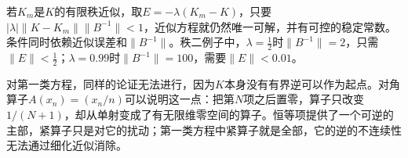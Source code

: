 若$K_m$是$K$的有限秩近似，取$E=-\lambda(K_m-K)$，只要$\lvert\lambda\rvert\lVert K-K_m\rVert\lVert B^{-1}\rVert<1$，近似方程就仍然唯一可解，并有可控的稳定常数。条件同时依赖近似误差和$\lVert B^{-1}\rVert$。秩二例子中，$\lambda=\frac12$时$\lVert B^{-1}\rVert=2$，只需$\lVert E\rVert<\frac12$；$\lambda=0.99$时$\lVert B^{-1}\rVert=100$，需要$\lVert E\rVert<0.01$。

对第一类方程，同样的论证无法进行，因为$K$本身没有有界逆可以作为起点。对角算子$A(x_n)=(x_n/n)$可以说明这一点：把第$N$项之后置零，算子只改变$1/(N+1)$，却从单射变成了有无限维零空间的算子。恒等项提供了一个可逆的主部，紧算子只是对它的扰动；第一类方程中紧算子就是全部，它的逆的不连续性无法通过细化近似消除。
